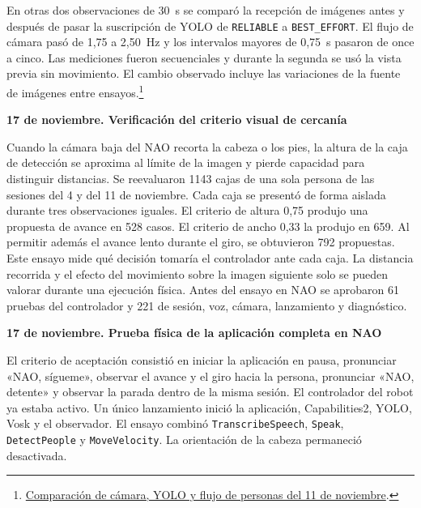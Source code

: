 \documentclass[11pt,letterpaper]{article}
\newcommand{\code}[1]{\nolinkurl{#1}}
\begin{document}
En otras dos observaciones de 30~s se comparó la recepción de imágenes antes y después de pasar la suscripción de YOLO de \code{RELIABLE} a \code{BEST_EFFORT}. El flujo de cámara pasó de 1,75 a 2,50~Hz y los intervalos mayores de 0,75~s pasaron de once a cinco. Las mediciones fueron secuenciales y durante la segunda se usó la vista previa sin movimiento. El cambio observado incluye las variaciones de la fuente de imágenes entre ensayos.\footnote{\href{https://github.com/jumafe1/portable-hri-reference-system/blob/910c05f/results/follow_stream_qos_comparison_20261111.json}{Comparación de cámara, YOLO y flujo de personas del 11 de noviembre}.}

\par\medskip\noindent\textbf{17 de noviembre. Verificación del criterio visual de cercanía}\par

Cuando la cámara baja del NAO recorta la cabeza o los pies, la altura de la caja de detección se aproxima al límite de la imagen y pierde capacidad para distinguir distancias. Se reevaluaron 1143 cajas de una sola persona de las sesiones del 4 y del 11 de noviembre. Cada caja se presentó de forma aislada durante tres observaciones iguales. El criterio de altura 0,75 produjo una propuesta de avance en 528 casos. El criterio de ancho 0,33 la produjo en 659. Al permitir además el avance lento durante el giro, se obtuvieron 792 propuestas. Este ensayo mide qué decisión tomaría el controlador ante cada caja. La distancia recorrida y el efecto del movimiento sobre la imagen siguiente solo se pueden valorar durante una ejecución física. Antes del ensayo en NAO se aprobaron 61 pruebas del controlador y 221 de sesión, voz, cámara, lanzamiento y diagnóstico.

\par\medskip\noindent\textbf{17 de noviembre. Prueba física de la aplicación completa en NAO}\par

El criterio de aceptación consistió en iniciar la aplicación en pausa, pronunciar «NAO, sígueme», observar el avance y el giro hacia la persona, pronunciar «NAO, detente» y observar la parada dentro de la misma sesión. El controlador del robot ya estaba activo. Un único lanzamiento inició la aplicación, Capabilities2, YOLO, Vosk y el observador. El ensayo combinó \code{TranscribeSpeech}, \code{Speak}, \code{DetectPeople} y \code{MoveVelocity}. La orientación de la cabeza permaneció desactivada.
\end{document}
